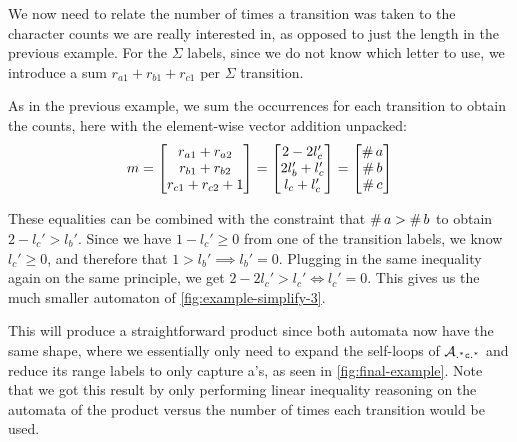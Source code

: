 \documentclass[acmsmall,review,anonymous,screen]{acmart}\settopmatter{printfolios=true,printccs=true,printacmref=true}
\theoremstyle{definition}
\begin{document}
  We now need to relate the number of times a transition was taken to the
  character counts we are really interested in, as opposed to just the length in
  the previous example. For the $\Sigma$ labels, since we do not know which
  letter to use, we introduce a sum $r_{a1} + r_{b1} + r_{c1}$ per $\Sigma$
  transition.

  As in the previous example, we sum the occurrences for each transition to
  obtain the counts, here with the element-wise vector addition unpacked:
  \[
m =   \begin{bmatrix}
  r_{a1} + r_{a2} \\
  r_{b1} + r_{b2} \\
  r_{c1} + r_{c2} + 1 \\
  \end{bmatrix} =
  \begin{bmatrix}
    2 -2l_c' \\
    2l_b' + l_c' \\
    l_c + l_c' \\
    \end{bmatrix} =
    \begin{bmatrix}
      \operatorname{\#}{a} \\
      \operatorname{\#}{b} \\
      \operatorname{\#}{c}
      \end{bmatrix}
  \]
  
These equalities can be combined with the constraint that $\operatorname{\#}{a} >
\operatorname{\#}{b}$ to obtain $2 - l_c' > l_b'$. Since we have $1-l_c' \geq 0$
from one of the transition labels, we know $l_c' \geq 0$, and therefore that $1
> l_b' \implies l_b' = 0$. Plugging in the same inequality again on the same
principle, we get $2 - 2l_c' > l_c' \iff l_c' = 0$. This gives us the much
smaller automaton of \cref{fig:example-simplify-3}.


This will produce a straightforward product since both automata now have the
same shape, where we essentially only need to expand the self-loops of
$\mathcal{A}_{\mathtt{.^\ast{}c.^\ast}}$ and reduce its range labels to only capture a's, as seen
in \cref{fig:final-example}. Note that we got this result by only performing
linear inequality reasoning on the automata of the product versus the number of
times each transition would be used.
\end{document}
